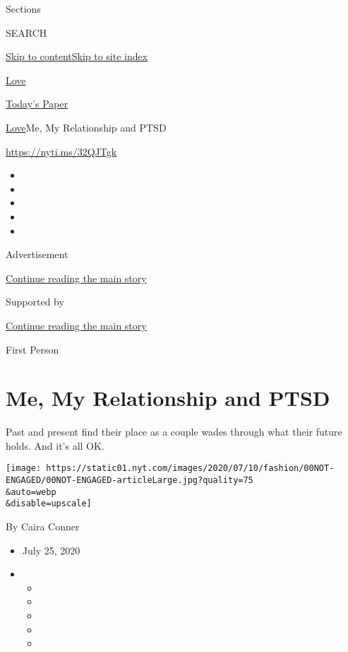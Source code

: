 Sections

SEARCH

\protect\hyperlink{site-content}{Skip to
content}\protect\hyperlink{site-index}{Skip to site index}

\href{https://www.nytimes.com/section/fashion/weddings}{Love}

\href{https://myaccount.nytimes.com/auth/login?response_type=cookie\&client_id=vi}{}

\href{https://www.nytimes.com/section/todayspaper}{Today's Paper}

\href{/section/fashion/weddings}{Love}\textbar{}Me, My Relationship and
PTSD

\url{https://nyti.ms/32QJTgk}

\begin{itemize}
\item
\item
\item
\item
\item
\end{itemize}

Advertisement

\protect\hyperlink{after-top}{Continue reading the main story}

Supported by

\protect\hyperlink{after-sponsor}{Continue reading the main story}

First Person

\hypertarget{me-my-relationship-and-ptsd}{%
\section{Me, My Relationship and
PTSD}\label{me-my-relationship-and-ptsd}}

Past and present find their place as a couple wades through what their
future holds. And it's all OK.

\texttt{[image: https://static01.nyt.com/images/2020/07/10/fashion/00NOT-ENGAGED/00NOT-ENGAGED-articleLarge.jpg?quality=75\\\&auto=webp\\\&disable=upscale]}

By Caira Conner

\begin{itemize}
\item
  July 25, 2020
\item
  \begin{itemize}
  \item
  \item
  \item
  \item
  \item
  \end{itemize}
\end{itemize}

